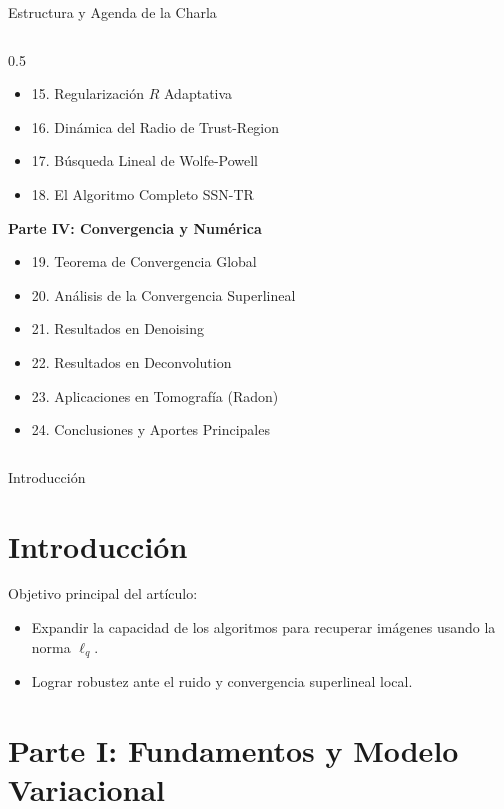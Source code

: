 \documentclass[aspectratio=169,11pt]{beamer}
\begin{document}
\begin{frame}{Estructura y Agenda de la Charla}
\begin{columns}[t]
\begin{column}{0.5\textwidth}
\begin{itemize}
                \item 15. Regularización $R$ Adaptativa
                \item 16. Dinámica del Radio de Trust-Region
                \item 17. Búsqueda Lineal de Wolfe-Powell
                \item 18. El Algoritmo Completo SSN-TR
            \end{itemize}
            \vspace{0.2cm}
            \textbf{Parte IV: Convergencia y Numérica}
            \begin{itemize}
                \item 19. Teorema de Convergencia Global
                \item 20. Análisis de la Convergencia Superlineal
                \item 21. Resultados en Denoising
                \item 22. Resultados en Deconvolution
                \item 23. Aplicaciones en Tomografía (Radon)
                \item 24. Conclusiones y Aportes Principales
            \end{itemize}
        \end{column}
    \end{columns}
\end{frame}

\begin{frame}{Introducción}
\section{Introducción}
Objetivo principal del artículo:
\begin{itemize}
    \item Expandir la capacidad de los algoritmos para recuperar imágenes usando la norma $\ell_q$.
    \item Lograr robustez ante el ruido y convergencia superlineal local.
\end{itemize}
\end{frame}
\section{Parte I: Fundamentos y Modelo Variacional}
\end{document}
